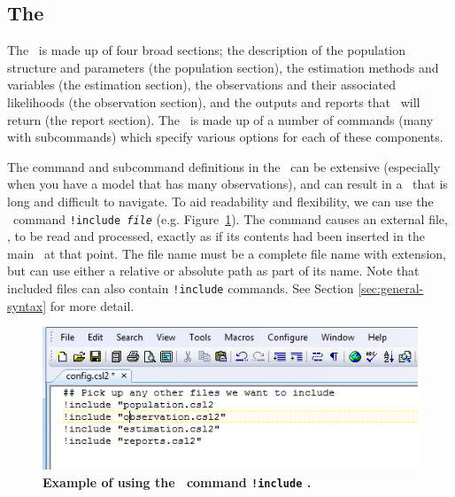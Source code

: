 \subsection{The \config\label{sec:config-files}}

The \config\ is made up of four broad sections; the description of the population structure and parameters (the population section), the estimation methods and variables (the estimation section), the observations and their associated likelihoods (the observation section), and the outputs and reports that \CNAME\ will return (the report section). The \config\ is made up of a number of commands (many with subcommands) which specify various options for each of these components.

The command and subcommand definitions in the \config\ can be extensive (especially when you have a model that has many observations), and can result in a \config\ that is long and difficult to navigate. To aid readability and flexibility, we can use the \config\ command \texttt{!include \emph{file}}  (e.g. Figure~\ref{fig:config_file_1}). The command causes an external file, , to be read and processed, exactly as if its contents had been inserted in the main \config\ at that point. The file name must be a complete file name with extension, but can use either a relative or absolute path as part of its name. Note that included files can also contain \texttt{!include} commands. See Section \ref{sec:general-syntax} for more detail.

\vspace*{3mm}
\begin{figure}[htp]
	\includegraphics[scale=1]{Figures/config.png}
	\caption{\textbf{Example of using the \config\ command \texttt{!include}
	  .}}\label{fig:config_file_1}
\end{figure}

\subsection{\label{sec:redirecting-stdout}}

